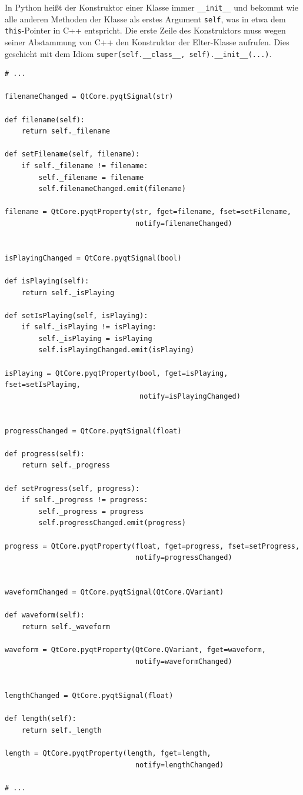 \documentclass[a4paper]{article}
\begin{document}
In Python heißt der Konstruktor einer Klasse immer \verb~__init__~ und bekommt wie alle anderen Methoden der Klasse als erstes Argument \verb~self~, was in etwa dem \verb~this~-Pointer in C++ entspricht. Die erste Zeile des Konstruktors muss wegen seiner Abstammung von C++ den Konstruktor der Elter-Klasse aufrufen. Dies geschieht mit dem Idiom \verb~super(self.__class__, self).__init__(...)~.

\begin{verbatim}
# ...

filenameChanged = QtCore.pyqtSignal(str)

def filename(self):
    return self._filename

def setFilename(self, filename):
    if self._filename != filename:
        self._filename = filename
        self.filenameChanged.emit(filename)

filename = QtCore.pyqtProperty(str, fget=filename, fset=setFilename,
                               notify=filenameChanged)


isPlayingChanged = QtCore.pyqtSignal(bool)

def isPlaying(self):
    return self._isPlaying

def setIsPlaying(self, isPlaying):
    if self._isPlaying != isPlaying:
        self._isPlaying = isPlaying
        self.isPlayingChanged.emit(isPlaying)

isPlaying = QtCore.pyqtProperty(bool, fget=isPlaying, fset=setIsPlaying,
                                notify=isPlayingChanged)


progressChanged = QtCore.pyqtSignal(float)

def progress(self):
    return self._progress

def setProgress(self, progress):
    if self._progress != progress:
        self._progress = progress
        self.progressChanged.emit(progress)

progress = QtCore.pyqtProperty(float, fget=progress, fset=setProgress,
                               notify=progressChanged)


waveformChanged = QtCore.pyqtSignal(QtCore.QVariant)

def waveform(self):
    return self._waveform

waveform = QtCore.pyqtProperty(QtCore.QVariant, fget=waveform,
                               notify=waveformChanged)


lengthChanged = QtCore.pyqtSignal(float)

def length(self):
    return self._length

length = QtCore.pyqtProperty(length, fget=length,
                               notify=lengthChanged)

# ...
\end{verbatim}
\end{document}
